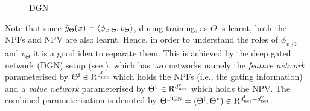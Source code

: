\begin{figure}[h]

\begin{minipage}{0.25\columnwidth}
\end{minipage}
\begin{minipage}{0.73\columnwidth}
\end{minipage}
\caption{DGN}
\label{fig:dgn}
\end{figure}

Note that since $\hat{y}_{\Theta}(x)=\langle \phi_{x,\Theta},v_{\Theta}\rangle$, during training, as $\Theta$ is learnt, both the NPFs and NPV are also learnt. Hence, in order to understand the roles of $\phi_{x,\Theta}$ and $v_{\Theta}$ it is a good idea to separate them. This is achieved by the deep gated network (DGN) setup (see ), which has two networks namely the \emph{feature network} parameterised by $\Theta^{\textrm{f}}\in\mathrm{R}^{d^{\text{f}}_{\text{net}}}$ which holds the NPFs (i.e., the gating information) and a \emph{value network} parameterised by ${\Theta}^{\text{v}}\in\mathrm{R}^{d^{\text{v}}_{\text{net}}}$ which holds the NPV.  The combined parameterisation is denoted by $\Theta^{\text{DGN}}=(\Theta^{\textrm{f}},{\Theta}^{\text{v}})\in \mathrm{R}^{d^{\text{f}}_{\text{net}}+d^{\text{v}}_{\text{net}}}$.  


